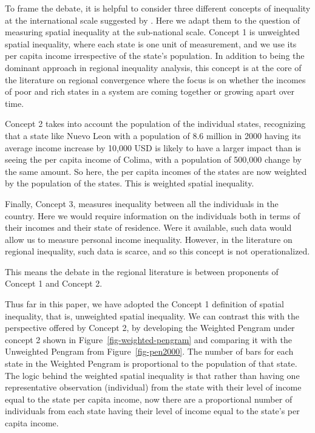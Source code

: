 \documentclass[
  a4paper, 
  twoside,
  final
]{article}
\begin{document}
To frame the debate, it is helpful to consider three different concepts
of inequality at the international scale suggested by
\citet{milanovic2007WorldsApart}. Here we adapt them to the question of
measuring spatial inequality at the sub-national scale. Concept 1 is
unweighted spatial inequality, where each state is one unit of
measurement, and we use its per capita income irrespective of the
state's population. In addition to being the dominant approach in
regional inequality analysis, this concept is at the core of the
literature on regional convergence \citep{rey1999us} where the focus is
on whether the incomes of poor and rich states in a system are coming
together or growing apart over time.

Concept 2 takes into account the population of the individual states,
recognizing that a state like Nuevo Leon with a population of 8.6
million in 2000 having its average income increase by 10,000 USD is
likely to have a larger impact than is seeing the per capita income of
Colima, with a population of 500,000 change by the same amount. So here,
the per capita incomes of the states are now weighted by the population
of the states. This is weighted spatial inequality.

Finally, Concept 3, measures inequality between all the individuals in
the country. Here we would require information on the individuals both
in terms of their incomes and their state of residence. Were it
available, such data would allow us to measure personal income
inequality. However, in the literature on regional inequality, such data
is scarce, and so this concept is not operationalized.

This means the debate in the regional literature is between proponents
of Concept 1 and Concept 2.

Thus far in this paper, we have adopted the Concept 1 definition of
spatial inequality, that is, unweighted spatial inequality. We can
contrast this with the perspective offered by Concept 2, by developing
the Weighted Pengram under concept 2 shown in
Figure~\ref{fig-weighted-pengram} and comparing it with the Unweighted
Pengram from Figure~\ref{fig-pen2000}. The number of bars for each state
in the Weighted Pengram is proportional to the population of that state.
The logic behind the weighted spatial inequality is that rather than
having one representative observation (individual) from the state with
their level of income equal to the state per capita income, now there
are a proportional number of individuals from each state having their
level of income equal to the state's per capita income.
\end{document}
